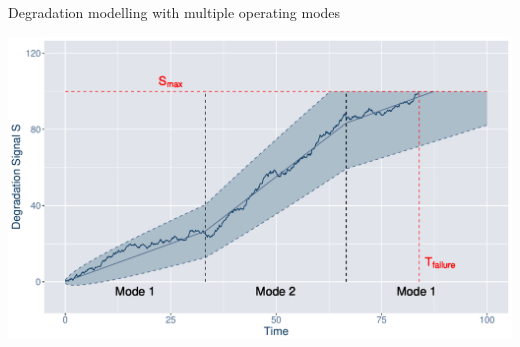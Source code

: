 \documentclass[aspectratio=169,slides]{beamer}
\begin{document}
\appendix
\begin{frame}[allowframebreaks]
    \tiny
    
    
\end{frame}

%    


\begin{frame}{Degradation modelling with multiple operating modes}
\begin{center}
    \includegraphics[scale=0.42]{example-wiener-om.pdf} \\
\end{center}
\end{frame}
\end{document}
